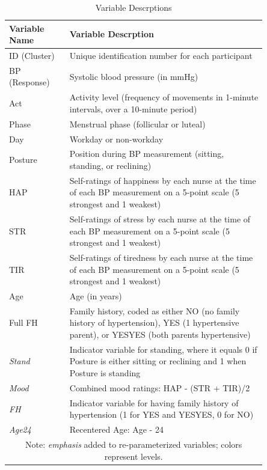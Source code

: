 \documentclass[12pt,twoside,leqno,fleqn,letterpaper]{article}
\theoremstyle{definition}
\theoremstyle{definition}
\begin{document}
\begin{table} 
    \centering\begin{tabular}{|p{0.2\linewidth} | p{0.65\linewidth}|}
        \hline
        Variable Name & Variable Descrption \\
        \hline\hline
        ID (Cluster) & Unique identification number for each participant \\
        \hline
        BP (Response) & Systolic blood pressure (in mmHg) \\
        \hline
        \textcolor[RGB]{208, 2, 27}{Act} & Activity level (frequency of movements in 1-minute intervals, over a 10-minute period) \\
        \hline
        \textcolor[RGB]{74, 144, 226}{Phase} & Menstrual phase (follicular or luteal) \\
        \hline
        \textcolor[RGB]{74, 144, 226}{Day} & Workday or non-workday \\
        \hline
        \textcolor[RGB]{208, 2, 27}{Posture} & Position during BP measurement (sitting, standing, or reclining) \\
        \hline
        \textcolor[RGB]{208, 2, 27}{HAP} & Self-ratings of happiness by each nurse at the time of each BP measurement on a 5-point scale (5 strongest and 1 weakest) \\
        \hline
        \textcolor[RGB]{208, 2, 27}{STR} & Self-ratings of stress by each nurse at the time of each BP measurement on a 5-point scale (5 strongest and 1 weakest) \\
        \hline
        \textcolor[RGB]{208, 2, 27}{TIR} & Self-ratings of tiredness by each nurse at the time of each BP measurement on a 5-point scale (5 strongest and 1 weakest) \\
        \hline
        \textcolor[RGB]{74, 144, 226}{Age} & Age (in years) \\
        \hline
        \textcolor[RGB]{74, 144, 226}{Full FH} & Family history, coded as either NO (no family history of  hypertension), YES (1 hypertensive parent), or YESYES (both parents hypertensive) \\
        \hline\hline
        \emph{\textcolor[RGB]{208, 2, 27}{Stand}} & Indicator variable for standing, where it equals 0 if Posture is either sitting or reclining and 1 when Posture is standing \\
        \hline
        \emph{\textcolor[RGB]{208, 2, 27}{Mood}} & Combined mood ratings: HAP - (STR + TIR)/2 \\
        \hline
        \emph{\textcolor[RGB]{74, 144, 226}{FH}} & Indicator variable for having family history of hypertension (1 for YES and YESYES, 0 for NO) \\
        \hline
        \emph{\textcolor[RGB]{74, 144, 226}{Age24}} & Recentered Age: Age - 24 \\
        \hline
        \multicolumn{2}{c}{\footnotesize Note: \emph{emphasis} added to re-parameterized variables; colors represent levels.}
    \end{tabular}
    \caption{Variable Descrptions}
    \label{tab: var desc}
\end{table}
\end{document}
